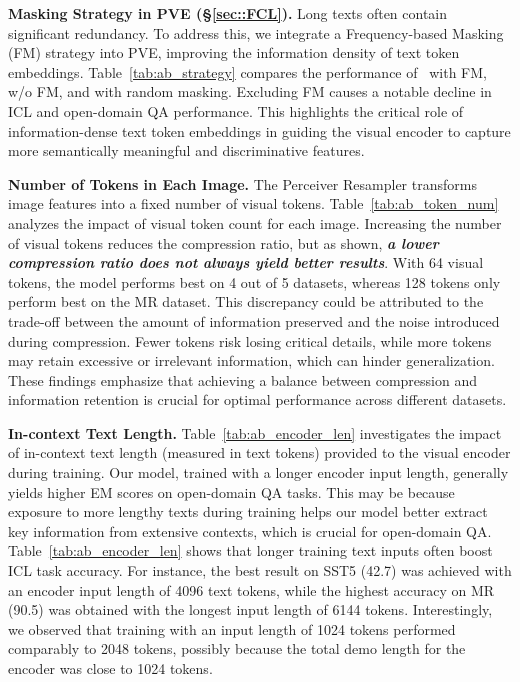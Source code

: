 



\noindent\textbf{Masking Strategy in PVE (\S\ref{sec::FCL}).} 
Long texts often contain significant redundancy. 
To address this, we integrate a Frequency-based Masking (FM) strategy into PVE, improving the information density of text token embeddings. Table~\ref{tab:ab_strategy} compares the performance of \ourname\ with FM, w/o FM, and with random masking.  
Excluding FM causes a notable decline in ICL and open-domain QA performance. 
This highlights the critical role of information-dense text token embeddings in guiding the visual encoder to capture more semantically meaningful and discriminative features.







  
\noindent\textbf{Number of Tokens in Each Image.}
The Perceiver Resampler transforms image features into a fixed number of visual tokens. Table~\ref{tab:ab_token_num} analyzes the impact of visual token count for each image. 
Increasing the number of visual tokens reduces the compression ratio, but as shown, \textit{\textbf{a lower compression ratio does not always yield better results}}. 
With 64 visual tokens, the model performs best on 4 out of 5 datasets, whereas 128 tokens only perform best on the MR dataset. 
This discrepancy could be attributed to the trade-off between the amount of information preserved and the noise introduced during compression. 
Fewer tokens risk losing critical details, while more tokens may retain excessive or irrelevant information, which can hinder generalization.  
These findings emphasize that achieving a balance between compression and information retention is crucial for optimal performance across different datasets.


\noindent\textbf{In-context Text Length.} Table~\ref{tab:ab_encoder_len} investigates the impact of in-context text length (measured in text tokens) provided to the visual encoder during training. 
Our model, trained with a longer encoder input length, generally yields higher EM scores on open-domain QA tasks. 
This may be because exposure to more lengthy texts during training helps our model better extract key information from extensive contexts, which is crucial for open-domain QA. 
Table~\ref{tab:ab_encoder_len} shows that longer training text inputs often boost ICL task accuracy. 
For instance, the best result on SST5 (42.7) was achieved with an encoder input length of 4096 text tokens, while the highest accuracy on MR (90.5) was obtained with the longest input length of 6144 tokens. 
Interestingly, we observed that training with an input length of 1024 tokens performed comparably to 2048 tokens,  possibly because the total demo length for the encoder was close to 1024 tokens.

